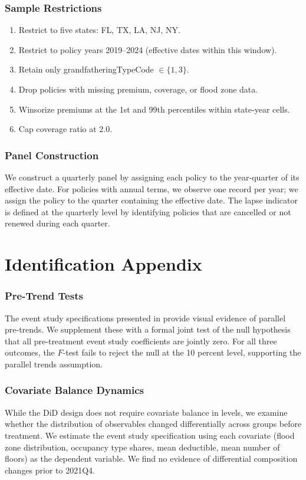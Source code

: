 \documentclass[12pt]{article}
\begin{document}
\subsubsection*{Sample Restrictions}

\begin{enumerate}
\item Restrict to five states: FL, TX, LA, NJ, NY.
\item Restrict to policy years 2019--2024 (effective dates within this window).
\item Retain only grandfatheringTypeCode $\in \{1, 3\}$.
\item Drop policies with missing premium, coverage, or flood zone data.
\item Winsorize premiums at the 1st and 99th percentiles within state-year cells.
\item Cap coverage ratio at 2.0.
\end{enumerate}

\subsubsection*{Panel Construction} We construct a quarterly panel by assigning each policy to the year-quarter of its effective date. For policies with annual terms, we observe one record per year; we assign the policy to the quarter containing the effective date. The lapse indicator is defined at the quarterly level by identifying policies that are cancelled or not renewed during each quarter.


\section{Identification Appendix}
\label{app:identification}

\subsubsection*{Pre-Trend Tests} The event study specifications presented in  provide visual evidence of parallel pre-trends. We supplement these with a formal joint test of the null hypothesis that all pre-treatment event study coefficients are jointly zero. For all three outcomes, the $F$-test fails to reject the null at the 10 percent level, supporting the parallel trends assumption.

\subsubsection*{Covariate Balance Dynamics} While the DiD design does not require covariate balance in levels, we examine whether the distribution of observables changed differentially across groups before treatment. We estimate the event study specification using each covariate (flood zone distribution, occupancy type shares, mean deductible, mean number of floors) as the dependent variable. We find no evidence of differential composition changes prior to 2021Q4.
\end{document}
